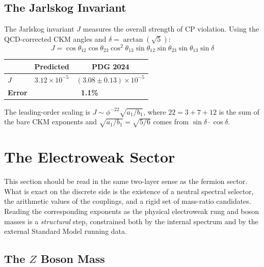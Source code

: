 \documentclass[12pt,a4paper]{article}
\theoremstyle{definition}
\begin{document}
\subsection{The Jarlskog Invariant}

The Jarlskog invariant $J$ measures the overall strength of CP violation. Using the QCD-corrected CKM angles and $\delta = \arctan(\sqrt{5})$:
\begin{equation}
J = \cos\theta_{12}\cos\theta_{23}\cos^2\theta_{13}\sin\theta_{12}\sin\theta_{23}\sin\theta_{13}\sin\delta
\end{equation}
\begin{center}
\begin{tabular}{lcc}
\toprule
& \textbf{Predicted} & \textbf{PDG 2024} \\
\midrule
$J$ & $3.12 \times 10^{-5}$ & $(3.08 \pm 0.13) \times 10^{-5}$ \\
\textbf{Error} & \multicolumn{2}{c}{\textbf{1.1\%}} \\
\bottomrule
\end{tabular}
\end{center}
The leading-order scaling is $J \sim \phi^{-22} \sqrt{a_1/b_1}$, where $22 = 3 + 7 + 12$ is the sum of the bare CKM exponents and $\sqrt{a_1/b_1} = \sqrt{5/6}$ comes from $\sin\delta \cdot \cos\delta$.



\section{The Electroweak Sector}
\label{sec:ew}

This section should be read in the same two-layer sense as the fermion sector.  What is exact on the discrete side is the existence of a neutral spectral selector, the arithmetic values of the couplings, and a rigid set of mass-ratio candidates.  Reading the corresponding exponents as the physical electroweak rung and boson masses is a \emph{structural} step, constrained both by the internal spectrum and by the external Standard Model running data.

\subsection{The \texorpdfstring{$Z$}{Z} Boson Mass}
\end{document}
